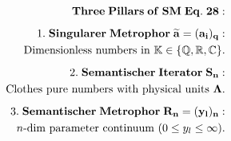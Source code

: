\documentclass[preview]{standalone}
\begin{document}
\begin{align*}
\special{dvisvgm:raw <g id='unique000'>}\mathbf{Three\;Pillars\;of\;SM\;Eq.\;28:}\\[5pt]1.\;\mathbf{Singularer\;Metrophor\;\widetilde{a}=(a_i)_q:}\\\;\;\text{Dimensionless numbers in }\mathbb{K}\in\{\mathbb{Q},\mathbb{R},\mathbb{C}\}.\\[5pt]2.\;\mathbf{Semantischer\;Iterator\;S_n:}\\\;\;\text{Clothes pure numbers with physical units }\mathbf{\Lambda}.\\[5pt]3.\;\mathbf{Semantischer\;Metrophor\;R_n=(y_l)_n:}\\\;\;n\text{-dim parameter continuum }(0\le y_l\le\infty).\special{dvisvgm:raw </g>}
\end{align*}
\end{document}
